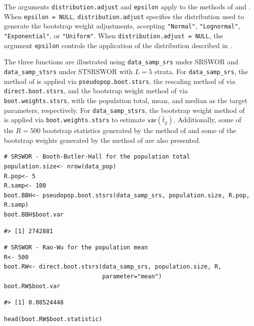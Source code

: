 The arguments \texttt{distribution.adjust} and \texttt{epsilon} apply to the methods of \citet{Bertail:Combris:1997} and \citet{Beaumont:Patak:2012}. When \texttt{epsilon\ =\ NULL}, \texttt{distribution.adjust} specifies the distribution used to generate the bootstrap weight adjustments, accepting \texttt{"Normal"}, \texttt{"Lognormal"}, \texttt{"Exponential"}, or \texttt{"Uniform"}. When \texttt{distribution.adjust\ =\ NULL}, the argument \texttt{epsilon} controls the application of the distribution described in \citet{Beaumont:Patak:2012}.

The three functions are illustrated using \texttt{data\_samp\_srs} under SRSWOR and \texttt{data\_samp\_stsrs} under STSRSWOR with \(L = 5\) strata. For \texttt{data\_samp\_srs}, the method of \citet{Booth:Butler:Hall:1994} is applied via \texttt{pseudopop.boot.stsrs}, the rescaling method of \citet{Rao:Wu:1988} via \texttt{direct.boot.stsrs}, and the bootstrap weight method of \citet{Chipperfield:Preston:2007} via \texttt{boot.weights.stsrs}, with the population total, mean, and median as the target parameters, respectively. For \texttt{data\_samp\_stsrs}, the bootstrap weight method of \citet{Rao:Wu:Yue:1992} is applied via \texttt{boot.weights.stsrs} to estimate \(\mathsf{var}(\hat{t}_y)\). Additionally, some of the \(R = 500\) bootstrap statistics generated by the method of \citet{Rao:Wu:1988} and some of the bootstrap weights generated by the method of \citet{Chipperfield:Preston:2007} are also presented.

\begin{verbatim}
# SRSWOR - Booth-Butler-Hall for the population total
population.size<- nrow(data_pop)
R.pop<- 5
R.samp<- 100
boot.BBH<- pseudopop.boot.stsrs(data_samp_srs, population.size, R.pop, R.samp)
boot.BBH$boot.var
\end{verbatim}

\begin{verbatim}
#> [1] 2742881
\end{verbatim}

\begin{verbatim}
# SRSWOR - Rao-Wu for the population mean
R<- 500
boot.RW<- direct.boot.stsrs(data_samp_srs, population.size, R,
                            parameter="mean")
boot.RW$boot.var
\end{verbatim}

\begin{verbatim}
#> [1] 0.08524448
\end{verbatim}

\begin{verbatim}
head(boot.RW$boot.statistic)
\end{verbatim}

